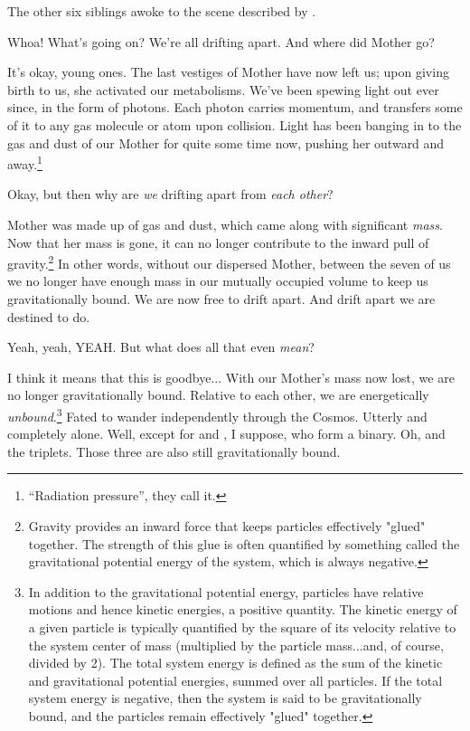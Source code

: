 \documentclass[main.tex]{subfiles}
\begin{document}
\par \nar The other six siblings awoke to the scene described by \rmsterope.  

\par \Electra Whoa!  What's going on?  We're all drifting apart.  And where did Mother go?

\par \Maia It's okay, young ones.  The last vestiges of Mother have now left us; upon giving birth to us, she activated our metabolisms.  We've been spewing light out ever since, in the form of photons.  Each photon carries momentum, and transfers some of it to any gas molecule or atom upon collision.  Light has been banging in to the gas and dust of our Mother for quite some time now, pushing her outward and away.\footnote{``Radiation pressure'', they call it.}

\par \Electra Okay, but then why are \textit{we} drifting apart from \textit{each other}?

\par \Maia Mother was made up of gas and dust, which came along with significant \textit{mass}.  Now that her mass is gone, it can no longer contribute to the inward pull of gravity.\footnote{Gravity provides an inward force that keeps particles effectively "glued" together.  The strength of this glue is often quantified by something called the gravitational potential energy of the system, which is always negative.}  In other words, without our dispersed Mother, between the seven of us we no longer have enough mass in our mutually occupied volume to keep us gravitationally bound.  We are now free to drift apart.  And drift apart we are destined to do.  

\par \Taygete Yeah, yeah, YEAH.  But what does all that even \textit{mean}?

\par \Sterope I think it means that this is goodbye...  With our Mother's mass now lost, we are no longer gravitationally bound.  Relative to each other, we are energetically \textit{unbound}.\footnote{In addition to the gravitational potential energy, particles have relative motions and hence kinetic energies, a positive quantity.  The kinetic energy of a given particle is typically quantified by the square of its velocity relative to the system center of mass (multiplied by the particle mass...and, of course, divided by 2).  The total system energy is defined as the sum of the kinetic and gravitational potential energies, summed over all particles.  If the total system energy is negative, then the system is said to be gravitationally bound, and the particles remain effectively "glued" together.}  Fated to wander independently through the Cosmos.  Utterly and completely alone.  Well, except for \rmmaia and \rmmerope, I suppose, who form a binary.  Oh, and the triplets.  Those three are also still gravitationally bound.
\end{document}
